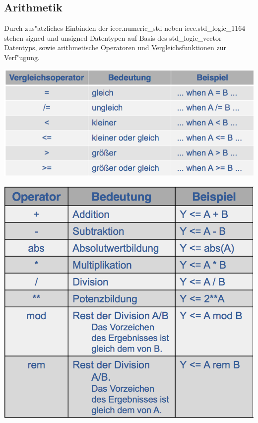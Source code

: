 \subsection{Arithmetik}
	\begin{minipage}{0.65\linewidth}
		Durch zus"atzliches Einbinden der ieee.numeric\_std neben ieee.std\_logic\_1164 stehen signed und unsigned Datentypen auf Basis des std\_logic\_vector Datentyps, sowie arithmetische Operatoren und Vergleichsfunktionen zur Verf"ugung.
		\begin{center}
		\includegraphics[width=0.45\linewidth]{pics/arithvergleich}
		\end{center}
	\end{minipage}
	\hspace{0.05\linewidth}
	\begin{minipage}{0.25\linewidth}
		\includegraphics[width=\linewidth]{pics/arithoperator}
	\end{minipage}

